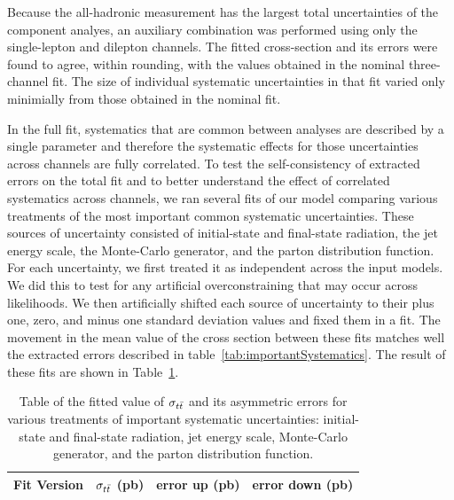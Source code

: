 Because the all-hadronic measurement has the largest total uncertainties of the component analyes, an auxiliary combination was performed using only the single-lepton and dilepton channels.
The fitted cross-section and its errors were found to agree, within rounding, with the values obtained in the nominal three-channel fit.
The size of individual systematic uncertainties in that fit varied only minimially from those obtained in the nominal fit.

\clearpage

In the full fit, systematics that are common between analyses are described by a single parameter and therefore the systematic effects for those uncertainties across channels are fully correlated.
To test the self-consistency of extracted errors on the total fit and to better understand the effect of correlated systematics across channels, 
we ran several fits of our model comparing various treatments of the most important common systematic uncertainties.
These sources of uncertainty consisted of initial-state and final-state radiation, the jet energy scale, the Monte-Carlo generator, and the parton distribution function.
For each uncertainty, we first treated it as independent across the input models.  
We did this to test for any artificial overconstraining that may occur across likelihoods.
We then artificially shifted each source of uncertainty to their plus one, zero, and minus one standard deviation values and fixed them in a fit. 
The movement in the mean value of the cross section between these fits matches well the extracted errors described in table~\ref{tab:importantSystematics}.
The result of these fits are shown in Table~\ref{tab:SystematicDecorrelation}. 

\begin{table}[htbp]

  \begin{center}  
    \begin{tabular}{|c|ccc|}
      \hline
      Fit Version & $\sigma_{t\bar{t}}$ (pb) & error up (pb) & error down (pb)  \\
      \hline
      \hline
      
      \hline
    \end{tabular}
  \end{center}
  \caption{ \label{tab:SystematicDecorrelation} Table of the fitted value of $\sigma_{ t\bar{t} }$ and its asymmetric errors for various treatments of important systematic uncertainties: initial-state and final-state radiation, jet energy scale, Monte-Carlo generator, and the parton distribution function.   }
\end{table}


